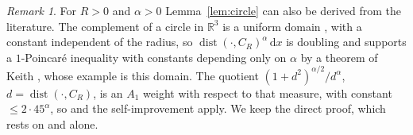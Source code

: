 \documentclass[11pt]{amsart}
\newcommand{\R}{\mathbb{R}}
\newcommand{\dd}{\,\mathrm{d}}
\DeclareMathOperator{\dist}{dist}
\theoremstyle{plain}
\theoremstyle{definition}
\theoremstyle{remark}
\newtheorem{remark}[theorem]{Remark}
\begin{document}
\begin{remark}\label{rem:keith}
For $R>0$ and $\alpha>0$ Lemma~\ref{lem:circle} can also be derived from the
literature. The complement of a circle in $\R^3$ is a uniform domain
\cite[Remark~5.3.1]{vaisala1988}, with a constant independent of the radius,
so $\dist(\cdot,C_R)^\alpha\dd x$ is doubling and supports a $1$-Poincar\'e
inequality with constants depending only on $\alpha$ by a theorem of Keith
\cite[Thm.~4]{keith2003}, whose example is this domain. The quotient
$(1+d^2)^{\alpha/2}/d^\alpha$, $d=\dist(\cdot,C_R)$, is an $A_1$ weight with
respect to that measure, with constant $\le2\cdot45^\alpha$, so
\cite[Thm.~4]{bjorn2001} and the self-improvement apply. We keep the direct
proof, which rests on \cite{bjorn2001} and \cite{hajlaszkoskela2000} alone.
\end{remark}
\end{document}
